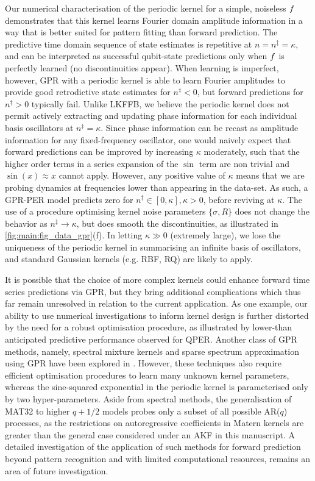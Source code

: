 Our numerical characterisation of the periodic kernel for a simple, noiseless $f$ demonstrates that this kernel learns Fourier domain amplitude information in a way that is better suited for pattern fitting than forward prediction. The predictive time domain sequence of state estimates is repetitive at $ n=n^\ddagger= \kappa$, and can be interpreted as successful qubit-state predictions only when $f$ is perfectly learned (no discontinuities appear). When learning is imperfect, however, GPR with a periodic kernel is able to learn Fourier amplitudes to provide good retrodictive state estimates for $n^\ddagger<0$, but forward predictions for $n^\ddagger>0$ typically fail.  Unlike LKFFB, we believe the periodic kernel does not permit actively extracting and updating phase information for each individual basis oscillators at $n^\ddagger= \kappa$.  Since phase information can be recast as amplitude information for any fixed-frequency oscillator, one would naively expect that forward predictions can be improved by increasing $\kappa$ moderately, such that the higher order terms in a series expansion of the $\sin$ term are non trivial and $\sin(x)\approx x$ cannot apply. However, any positive value of $\kappa$ means that we are probing dynamics at frequencies lower than appearing in the data-set. As such, a GPR-PER model predicts zero for $n^\ddagger \in [0, \kappa], \kappa > 0$, before reviving at $\kappa$.  The use of a procedure optimising kernel noise parameters $\{\sigma, R\}$ does not change the behavior as $ n^\ddagger \to\kappa$, but does smooth the discontinuities, as illustrated in \cref{fig:main:fig_data_gpr}(f). In letting $\kappa \gg 0$ (extremely large), we lose the uniqueness of the periodic kernel in summarising an infinite basis of oscillators, and standard Gaussian kernels (e.g. RBF, RQ) are likely to apply. 

It is possible that the choice of more complex kernels could enhance forward time series predictions via GPR, but they bring additional complications which thus far remain unresolved in relation to the current application. As one example, our ability to use numerical investigations to inform kernel design is further distorted by the need for a robust optimisation procedure, as illustrated by lower-than anticipated predictive performance observed for QPER.  Another class of GPR methods, namely, spectral mixture kernels and sparse spectrum approximation using GPR have been explored in \cite{wilson2013, quia2010}. However, these techniques also require efficient optimisation procedures to learn many unknown kernel parameters, whereas the sine-squared exponential in the periodic kernel is parameterised only by two hyper-parameters. Aside from spectral methods, the generalisation of MAT32 to higher $q + 1/2$ models probes only a subset of all possible AR($q$) processes, as the restrictions on autoregressive coefficients in Matern kernels are greater than the general case considered under an AKF in this manuscript. A detailed investigation of the application of such methods for forward prediction beyond pattern recognition and with limited computational resources, remains an area of future investigation.


